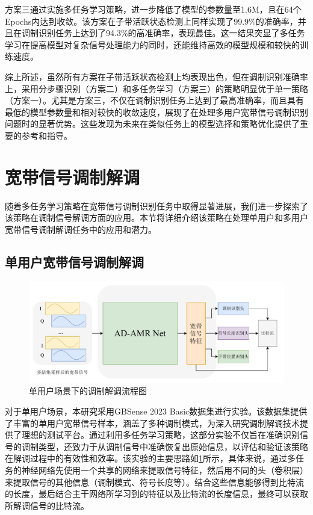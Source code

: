 方案三通过实施多任务学习策略，进一步降低了模型的参数量至1.6M，且在64个Epochs内达到收敛。该方案在子带活跃状态检测上同样实现了99.9\%的准确率，并且在调制识别任务上达到了94.3\%的高准确率，表现最佳。这一结果突显了多任务学习在提高模型对复杂信号处理能力的同时，还能维持高效的模型规模和较快的训练速度。

综上所述，虽然所有方案在子带活跃状态检测上均表现出色，但在调制识别准确率上，采用分步骤识别（方案二）和多任务学习（方案三）的策略明显优于单一策略（方案一）。尤其是方案三，不仅在调制识别任务上达到了最高准确率，而且具有最低的模型参数量和相对较快的收敛速度，展现了在处理多用户宽带信号调制识别问题时的显著优势。这些发现为未来在类似任务上的模型选择和策略优化提供了重要的参考和指导。

\section{宽带信号调制解调}\label{sec:mod_demod}

随着多任务学习策略在宽带信号调制识别任务中取得显著进展，我们进一步探索了该策略在调制信号解调方面的应用。本节将详细介绍该策略在处理单用户和多用户宽带信号调制解调任务中的应用和潜力。

\subsection{单用户宽带信号调制解调}


\begin{figure}
    \centering
    \includegraphics[width=\textwidth]{Image/adamr-wideband_demodulate.pdf}
    \caption{单用户场景下的调制解调流程图}\label{fig:demode_single}
\end{figure}

对于单用户场景，本研究采用GBSense 2023 Basic数据集进行实验。该数据集提供了丰富的单用户宽带信号样本，涵盖了多种调制模式，为深入研究调制解调技术提供了理想的测试平台。通过利用多任务学习策略，这部分实验不仅旨在准确识别信号的调制类型，还致力于从调制信号中准确恢复出原始信息，以评估和验证该策略在解调过程中的有效性和效率。该实验的主要思路如\ref{fig:demode_single}所示，具体来说，通过多任务的神经网络先使用一个共享的网络来提取信号特征，然后用不同的头（卷积层）来提取信号的其他信息（调制模式、符号长度等）。结合这些信息能够得到比特流的长度，最后结合主干网络所学习到的特征以及比特流的长度信息，最终可以获取所解调信号的比特流。

